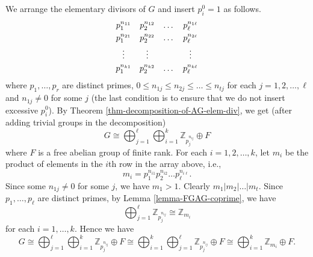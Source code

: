 \begin{sketch}  We arrange the elementary divisors of $G$ and insert $p_i^0 = 1$ as follows.
	$$
	\begin{array}{ccccc}
		p_1^{n_{11}} & p_2^{n_{12}} & \dots & p_\ell^{n_{1\ell}} \smallskip\\
		p_1^{n_{21}} & p_2^{n_{22}} & \dots & p_\ell^{n_{2\ell}} \smallskip\\
		\vdots & \vdots & & \vdots \smallskip\\
		p_1^{n_{k1}} & p_2^{n_{k2}} & \dots & p_\ell^{n_{k\ell}}
	\end{array}
	$$
	where $p_1, \dots, p_r$ are distinct primes, $0 \le n_{1j} \le n_{2j} \le \dots \le n_{tj}$ for each $j=1,2,\dots,\ell$ and $n_{1j} \neq 0$ for some $j$ (the last condition is to ensure that we do not insert excessive $p_i^0$). By Theorem \ref{thm-decomposition-of-AG-elem-div}, we get (after adding trivial groups in the decomposition)
	\begin{equation*}
		G \cong \bigoplus_{j=1}^\ell \bigoplus_{i=1}^{k} \mathbb{Z}_{p_j^{n_{ij}}} \oplus F
	\end{equation*}  where $F$ is a  free abelian group of finite rank. For each $i=1,2,\dots,k$, let $m_i$ be the product of elements in the $i$th row in the array above, i.e., 
	\begin{equation*}
		m_i = p_1^{n_{i1}} p_2^{n_{i2}} \dots p_\ell^{n_{i\ell}}.
	\end{equation*} Since some $n_{1j} \neq 0$ for some $j$, we have $m_1 > 1$. Clearly $m_1 | m_2 | \dots | m_t$. Since $p_1,\dots, p_\ell$ are distinct primes, by Lemma \ref{lemma-FGAG-coprime}, we have
	$$ \bigoplus_{j=1}^\ell \mathbb{Z}_{p_j^{n_{ij}}}  \cong  \mathbb{Z}_{m_i}$$
	for each $i = 1,\dots, k$. Hence we have
	\begin{equation*}
		G \cong \bigoplus_{j=1}^\ell \bigoplus_{i=1}^{k} \mathbb{Z}_{p_j^{n_{ij}}} \oplus F \cong  \bigoplus_{i=1}^{k} \bigoplus_{j=1}^\ell \mathbb{Z}_{p_j^{n_{ij}}} \oplus F \cong \bigoplus_{i=1}^{k} \mathbb{Z}_{m_i} \oplus F.
	\end{equation*}
	

\end{sketch}
